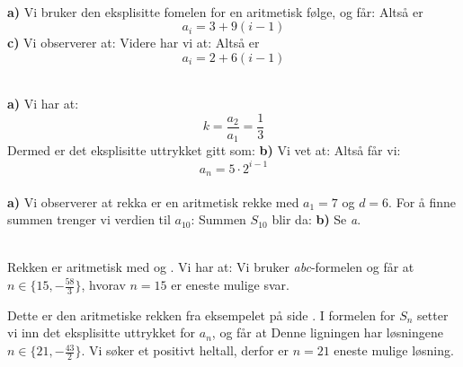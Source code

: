 

\usepackage{xr}

\setlength{\parskip}{11pt}

\\
\textbf{a)}
Vi bruker den eksplisitte fomelen for en aritmetisk følge, og får:
Altså er
\[ a_i=3+9(i-1) \]
\textbf{c)}
Vi observerer at:
Videre har vi at:\vs
{}
Altså er
\[ a_i=2+6(i-1) \]

\\
\textbf{a)}
Vi har at:
\[ k=\frac{a_2}{a_1}= \frac{1}{3}\]
Dermed er det eksplisitte uttrykket gitt som:
\textbf{b)}
Vi vet at:
Altså får vi:
\[ a_n = 5\cdot2^{i-1} \]
\newpage
{}\\
\textbf{a)} Vi observerer at rekka er en aritmetisk rekke med $ a_1= 7$ og $ d= 6$. For å finne summen trenger vi verdien til $ a_{10} $:
Summen $ S_{10} $ blir da:
\textbf{b)} Se \textsl{a}.

 \\
Rekken er aritmetisk med  og . Vi har at:
Vi bruker \textit{abc}-formelen og får at $ {n\in\lbrace15, -\frac{58}{3}\rbrace} $, hvorav $ {n=15} $ er eneste mulige svar. 

Dette er den aritmetiske rekken fra eksempelet på side \pageref{arrekeks}. I formelen for $ S_n $ setter vi inn det eksplisitte uttrykket for $ a_n $, og får at	
Denne ligningen har løsningene $ {n\in \big\lbrace21, -\frac{43}{2} \big\rbrace}$. Vi søker et positivt heltall, derfor er $ {n=21} $ eneste mulige løsning.


